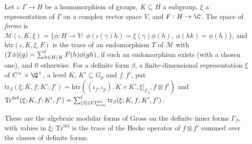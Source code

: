 \begin{definition}\label{pf:ks1:def-dtrace}
Let $\iota:\Gamma\to H$ be a homomorphism of groups, $K\subseteq H$ a subgroup, $\xi$ a representation of $\Gamma$ on a
complex vector space $V$, and $F:H\to\C$. The space of \emph{forms} is
$\mathcal M(\iota,K,\xi)=\{\phi:H\to V:\ \phi(\iota(\gamma)h)=\xi(\gamma)\phi(h),\ \phi(hk)=\phi(h)\}$, and
$\mathrm{htr}(\iota,K,\xi,F)$ is the trace of an endomorphism $T$ of $\mathcal M$ with
$(T\phi)(g)=\textstyle\sum\nolimits^{\mathrm f}_{h\in H/K}F(h)\phi(gh)$, if such an endomorphism exists (with a chosen one), and $0$ otherwise. For a
definite form $\beta$, a finite-dimensional representation $\xi$ of $C^\times\times\Q^\times$, a level $K$, $K'\subseteq G_p$
and $f,f'$, put $\mathrm{tr}_\beta(\xi;K,f;K',f')=\mathrm{htr}((\iota_f,\iota_p),K\times K',\xi|_{\Gamma_\beta},f\otimes f')$
and $\mathrm{Tr}^{\mathrm{def}}(\xi;K,f;K',f')=\textstyle\sum\nolimits^{\mathrm f}_{[\beta]\in\mathrm{Cl}^{\mathrm{def}}_{\mathrm{form}}}\mathrm{tr}_\beta(\xi;K,f;K',f')$.
\end{definition}

These are the algebraic modular forms of Gross \cite{Gross1999} on the definite inner forms $\Gamma_\beta$, with values in
$\xi$; $\mathrm{Tr}^{\mathrm{def}}$ is the trace of the Hecke operator of $f\otimes f'$ summed over the classes of definite forms.

